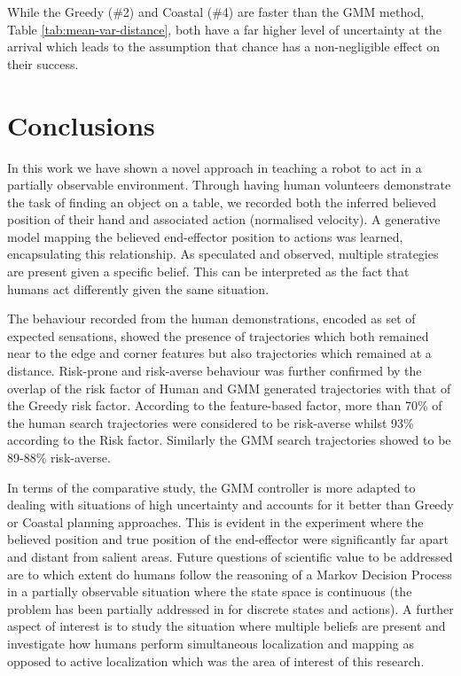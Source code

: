 While  the Greedy (\#2) and Coastal (\#4) are faster than the GMM method, Table \ref{tab:mean-var-distance}, both have a far higher level 
of uncertainty at the arrival which leads to the assumption that chance has a non-negligible effect on their success. 




\FloatBarrier
\section{Conclusions}

In this work we have shown a novel approach in teaching a robot to act in a partially observable environment. 
Through having human volunteers demonstrate the task of finding an object on a table, we recorded both the 
inferred believed position of their hand and associated action (normalised velocity). A generative model
mapping the believed end-effector position to actions was learned, encapsulating this relationship. 
As speculated and observed, multiple strategies are present given a specific belief. This can be interpreted as the fact that 
humans act differently given the same situation. 

The behaviour recorded from the human demonstrations, encoded as set of expected sensations, showed
the presence of trajectories which both remained near to the edge and corner features but also 
trajectories which remained at a distance. Risk-prone and risk-averse behaviour was further 
confirmed by the overlap of the risk factor of Human and GMM generated trajectories with that of the Greedy
risk factor. According to the feature-based factor, more than 70\% of the human search trajectories were considered
to be risk-averse whilst 93\% according to the Risk factor. Similarly the GMM search trajectories showed to be
89-88\% risk-averse.

In terms of the comparative study, the GMM controller is more adapted to dealing with situations of high uncertainty and 
accounts for it better than Greedy or Coastal planning approaches. This is evident in the experiment
where the believed position and true position of the end-effector were significantly far apart and distant from salient areas. 
Future questions of scientific value to be addressed are to which extent do humans follow the reasoning 
of a Markov Decision Process in a partially observable situation where the state space is continuous 
(the problem has been partially addressed in \cite{Bake_Saxe_Tene_2011} for discrete states and actions). A further aspect of interest
is to study the situation where multiple beliefs are present and investigate how humans 
perform simultaneous localization and mapping as opposed to active localization which was the area of interest of 
this research. 